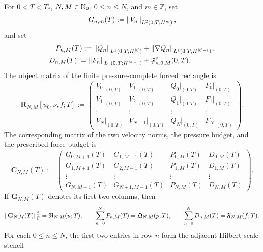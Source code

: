 \begin{proposition}
\label{f:prop:sobolev-rectangle-matrix}
For \(0<T<T_*\), \(N,M\in\mathbb N_0\), \(0\le n\le N\), and
\(m\in\mathbb Z\), set
\[
 G_{n,m}(T):=\left\lVert V_n\right\rVert_{L^2(0,T;H^m)},
\]
and set
\begin{align*}
 P_{n,M}(T):=\left\lVert Q_n\right\rVert_{L^1(0,T;H^M)}
 &+\left\lVert \nabla Q_n\right\rVert_{L^1(0,T;H^{M-1})},\\
 D_{n,M}(T):=\left\lVert F_n\right\rVert_{L^1(0,T;H^{M-1})}
 &+\mathfrak F^{\rm p}_{n,0,M}(0,T).
\end{align*}
The object matrix of the finite pressure-complete forced rectangle is
\begin{equation}
 \mathbf R_{N,M}[u_0,\nu,f;T]
 :=
 \begin{pmatrix}
  V_0|_{(0,T)}&V_1|_{(0,T)}&Q_0|_{(0,T)}&F_0|_{(0,T)}\\
  V_1|_{(0,T)}&V_2|_{(0,T)}&Q_1|_{(0,T)}&F_1|_{(0,T)}\\
  \vdots&\vdots&\vdots&\vdots\\
  V_N|_{(0,T)}&V_{N+1}|_{(0,T)}&Q_N|_{(0,T)}&F_N|_{(0,T)}
 \end{pmatrix}.
 \label{f:eq:finite-rectangle-object-matrix}
\end{equation}
The corresponding matrix of the two velocity norms, the pressure budget, and
the prescribed-force budget is
\begin{equation}
 \mathbf C_{N,M}(T)
 :=
 \begin{pmatrix}
  G_{0,M+1}(T)&G_{1,M-1}(T)&P_{0,M}(T)&D_{0,M}(T)\\
  G_{1,M+1}(T)&G_{2,M-1}(T)&P_{1,M}(T)&D_{1,M}(T)\\
  \vdots&\vdots&\vdots&\vdots\\
  G_{N,M+1}(T)&G_{N+1,M-1}(T)&P_{N,M}(T)&D_{N,M}(T)
 \end{pmatrix}.
 \label{f:eq:sobolev-pressure-complete-rectangle-matrix}
\end{equation}
If \(\mathbf G_{N,M}(T)\) denotes its first two columns, then
\begin{equation}
 \left\lVert \mathbf G_{N,M}(T)\right\rVert_{\mathrm F}^2
 =\mathfrak R_{N,M}(u;T),
 \qquad
 \sum_{n=0}^NP_{n,M}(T)=\mathfrak Q_{N,M}(p;T),
 \qquad
 \sum_{n=0}^ND_{n,M}(T)=\mathfrak F_{N,M}(f;T).
 \label{f:eq:rectangle-matrix-norm-identities}
\end{equation}
For each \(0\le n\le N\), the first two entries in row \(n\) form the
adjacent Hilbert-scale stencil
\begin{equation}
 \left.
 \begin{array}{c}

\end{array}
\end{equation}
\end{proposition}
